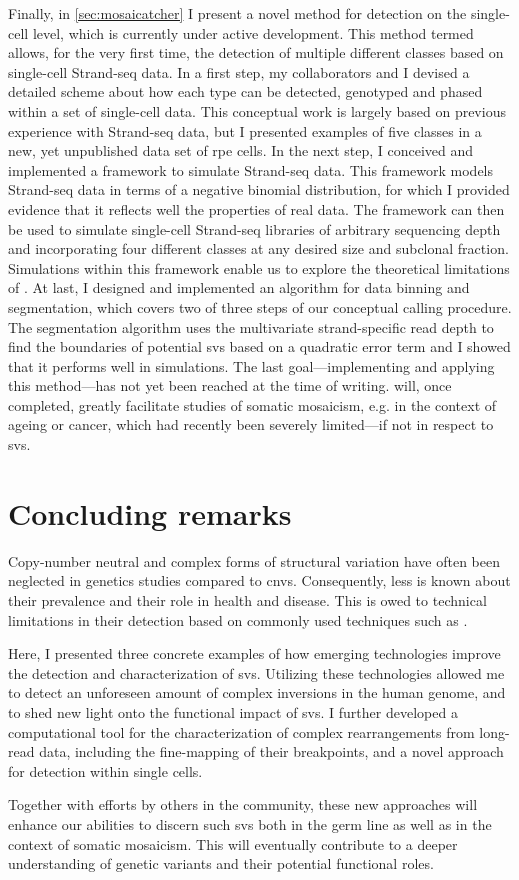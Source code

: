 Finally, in \cref{sec:mosaicatcher} I present a novel method for \sv detection on
the single-cell level, which is currently under active development. This method
termed \mc allows, for the very first time, the detection of
multiple different \sv classes based on single-cell Strand-seq data. In a first
step, my collaborators and I devised a detailed scheme about how each \sv type
can be detected, genotyped and phased within a set of single-cell data. This
conceptual work is largely based on previous experience with Strand-seq data,
but I presented examples of five \sv classes in a new, yet
unpublished data set of \acl{rpe} cells. In the next step, I conceived and
implemented a framework to simulate Strand-seq data. This framework models
Strand-seq data in terms of a negative binomial distribution, for which I
provided evidence that it reflects well the properties of real data. The
framework can then be used to simulate single-cell Strand-seq libraries of
arbitrary sequencing depth and incorporating four
different \sv classes at any desired size and subclonal fraction. Simulations
within this framework enable us to explore the theoretical limitations of
\mc. At last, I designed and implemented an algorithm for data binning
and segmentation, which covers two of three steps of our conceptual \sv calling
procedure. The segmentation algorithm uses the multivariate strand-specific read
depth to find the boundaries of potential \acp{sv} based on a quadratic error
term and I showed that it performs well in
simulations. The last goal---implementing and applying this method---has not yet
been reached at the time of writing. \mc will, once completed, greatly
facilitate studies of somatic mosaicism, e.g. in the context of ageing or cancer,
which had recently been severely limited---if not in respect to \acp{sv}.




\section{Concluding remarks}
Copy-number neutral and complex forms of structural variation have often been
neglected in genetics studies compared to \acp{cnv}. Consequently, less is known
about their prevalence and their role in health and disease. This is owed to
technical limitations in their detection based on commonly used techniques
such as \mps.

Here, I presented three concrete examples of how emerging technologies improve
the detection and characterization of \acp{sv}. Utilizing these technologies
allowed me to detect an unforeseen amount of complex inversions in the human
genome, and to shed new light onto the functional impact of \acp{sv}.
I further developed a computational tool for the characterization of complex
rearrangements from long-read data, including the fine-mapping of their
breakpoints, and a novel approach for \sv detection within single cells.

Together with efforts by others in the community, these new approaches will
enhance our abilities to discern such \acp{sv} both in the germ line as well as
in the context of somatic mosaicism. This will eventually contribute to a deeper
understanding of genetic variants and their potential functional roles.


